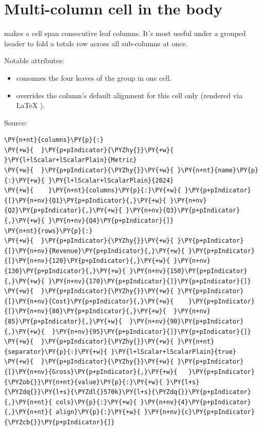 \documentclass[a4paper,twoside]{article}
\begin{document}
\section{Multi-column cell in the body}
 makes a cell span  consecutive leaf columns. It's most useful
under a grouped header to fold a totals row across all sub-columns at once.

Notable attributes:
\begin{itemize}
\item {} consumes the four leaves of the  group in one cell.
\item {} overrides the column's default alignment for this cell only
(rendered via \LaTeX{} ).
\end{itemize}
Source:
\begin{tscode}[lang=yaml, engine=pygments]
\begin{Verbatim}[commandchars=\\\{\},breaklines, breakanywhere, commandchars=\\\{\}]
\PY{n+nt}{columns}\PY{p}{:}
\PY{+w}{  }\PY{p+pIndicator}{\PYZhy{}}\PY{+w}{ }\PY{l+lScalar+lScalarPlain}{Metric}
\PY{+w}{  }\PY{p+pIndicator}{\PYZhy{}}\PY{+w}{ }\PY{n+nt}{name}\PY{p}{:}\PY{+w}{ }\PY{l+lScalar+lScalarPlain}{2024}
\PY{+w}{    }\PY{n+nt}{columns}\PY{p}{:}\PY{+w}{ }\PY{p+pIndicator}{[}\PY{n+nv}{Q1}\PY{p+pIndicator}{,}\PY{+w}{ }\PY{n+nv}{Q2}\PY{p+pIndicator}{,}\PY{+w}{ }\PY{n+nv}{Q3}\PY{p+pIndicator}{,}\PY{+w}{ }\PY{n+nv}{Q4}\PY{p+pIndicator}{]}
\PY{n+nt}{rows}\PY{p}{:}
\PY{+w}{  }\PY{p+pIndicator}{\PYZhy{}}\PY{+w}{ }\PY{p+pIndicator}{[}\PY{n+nv}{Revenue}\PY{p+pIndicator}{,}\PY{+w}{ }\PY{p+pIndicator}{[}\PY{n+nv}{120}\PY{p+pIndicator}{,}\PY{+w}{ }\PY{n+nv}{130}\PY{p+pIndicator}{,}\PY{+w}{ }\PY{n+nv}{150}\PY{p+pIndicator}{,}\PY{+w}{ }\PY{n+nv}{170}\PY{p+pIndicator}{]}\PY{p+pIndicator}{]}
\PY{+w}{  }\PY{p+pIndicator}{\PYZhy{}}\PY{+w}{ }\PY{p+pIndicator}{[}\PY{n+nv}{Cost}\PY{p+pIndicator}{,}\PY{+w}{    }\PY{p+pIndicator}{[}\PY{n+nv}{80}\PY{p+pIndicator}{,}\PY{+w}{  }\PY{n+nv}{85}\PY{p+pIndicator}{,}\PY{+w}{  }\PY{n+nv}{90}\PY{p+pIndicator}{,}\PY{+w}{  }\PY{n+nv}{95}\PY{p+pIndicator}{]}\PY{p+pIndicator}{]}
\PY{+w}{  }\PY{p+pIndicator}{\PYZhy{}}\PY{+w}{ }\PY{n+nt}{separator}\PY{p}{:}\PY{+w}{ }\PY{l+lScalar+lScalarPlain}{true}
\PY{+w}{  }\PY{p+pIndicator}{\PYZhy{}}\PY{+w}{ }\PY{p+pIndicator}{[}\PY{n+nv}{Gross}\PY{p+pIndicator}{,}\PY{+w}{   }\PY{p+pIndicator}{\PYZob{}}\PY{n+nt}{value}\PY{p}{:}\PY{+w}{ }\PY{l+s}{\PYZdq{}}\PY{l+s}{\PYZdl{}570k}\PY{l+s}{\PYZdq{}}\PY{p+pIndicator}{,}\PY{n+nt}{ cols}\PY{p}{:}\PY{+w}{ }\PY{n+nv}{4}\PY{p+pIndicator}{,}\PY{n+nt}{ align}\PY{p}{:}\PY{+w}{ }\PY{n+nv}{c}\PY{p+pIndicator}{\PYZcb{}}\PY{p+pIndicator}{]}
\end{Verbatim}
\end{tscode}
\end{document}
